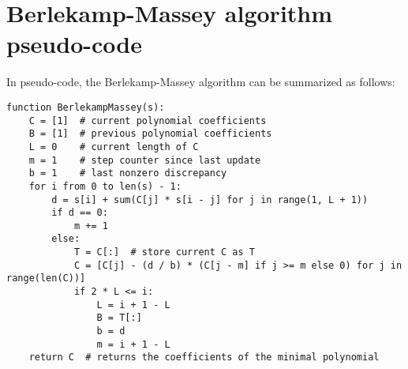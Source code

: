 \documentclass[a4paper, 11pt]{article}
\begin{document}
\section{Berlekamp-Massey algorithm pseudo-code}
In pseudo-code, the Berlekamp-Massey algorithm can be summarized as follows:
\begin{verbatim}
function BerlekampMassey(s):
    C = [1]  # current polynomial coefficients
    B = [1]  # previous polynomial coefficients
    L = 0    # current length of C
    m = 1    # step counter since last update
    b = 1    # last nonzero discrepancy
    for i from 0 to len(s) - 1:
        d = s[i] + sum(C[j] * s[i - j] for j in range(1, L + 1))
        if d == 0:
            m += 1
        else:
            T = C[:]  # store current C as T
            C = [C[j] - (d / b) * (C[j - m] if j >= m else 0) for j in range(len(C))]
            if 2 * L <= i:
                L = i + 1 - L
                B = T[:]
                b = d
                m = i + 1 - L
    return C  # returns the coefficients of the minimal polynomial
\end{verbatim}



\end{document}
